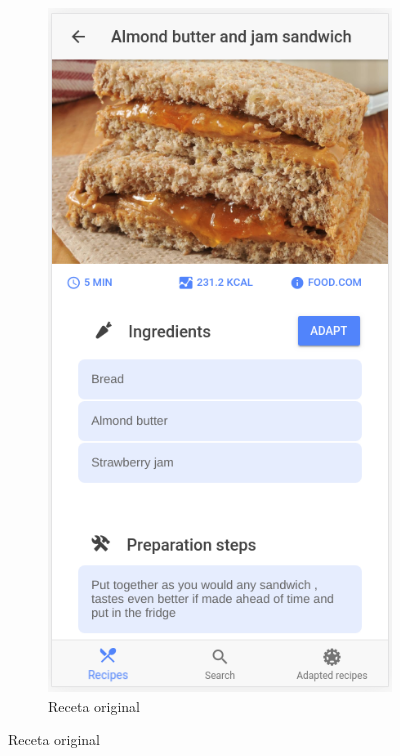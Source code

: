 \begin{figure}[H]
\begin{subfigure}[b]{0.322\linewidth}
        \label{fig:pantallas_basicas_1}
    \end{subfigure}
    \begin{subfigure}[b]{0.32\linewidth}
        \includegraphics[width=\linewidth]{imagenes/app/pantallas/app_2.png}
        \caption{Receta original}

\end{subfigure}
\end{figure}

